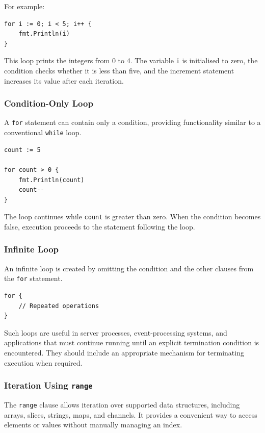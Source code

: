For example:

\begin{lstlisting}
for i := 0; i < 5; i++ {
    fmt.Println(i)
}
\end{lstlisting}

This loop prints the integers from 0 to 4. The variable
\texttt{i} is initialised to zero, the condition checks
whether it is less than five, and the increment statement
increases its value after each iteration.

\subsubsection{Condition-Only Loop}

A \texttt{for} statement can contain only a condition,
providing functionality similar to a conventional
\texttt{while} loop.

\begin{lstlisting}
count := 5

for count > 0 {
    fmt.Println(count)
    count--
}
\end{lstlisting}

The loop continues while \texttt{count} is greater than zero.
When the condition becomes false, execution proceeds to the
statement following the loop.

\subsubsection{Infinite Loop}

An infinite loop is created by omitting the condition and
the other clauses from the \texttt{for} statement.

\begin{lstlisting}
for {
    // Repeated operations
}
\end{lstlisting}

Such loops are useful in server processes, event-processing
systems, and applications that must continue running until
an explicit termination condition is encountered. They
should include an appropriate mechanism for terminating
execution when required.

\subsubsection{Iteration Using \texttt{range}}

The \texttt{range} clause allows iteration over supported
data structures, including arrays, slices, strings, maps,
and channels. It provides a convenient way to access
elements or values without manually managing an index.

